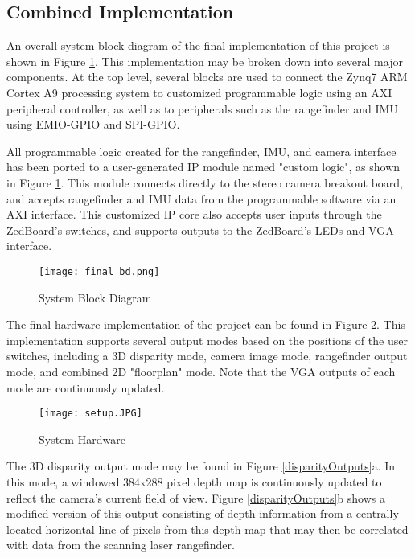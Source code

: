 \subsection{Combined Implementation}
An overall system block diagram of the final implementation of this project is shown in Figure \ref{finalBD}. This implementation may be broken down into several major components. At the top level, several blocks are used to connect the Zynq7 ARM Cortex A9 processing system to customized programmable logic using an AXI peripheral controller, as well as to peripherals such as the rangefinder and IMU using EMIO-GPIO and SPI-GPIO. 
\par
All programmable logic created for the rangefinder, IMU, and camera interface has been ported to a user-generated IP module named "custom logic", as shown in Figure \ref{finalBD}. This module connects directly to the stereo camera breakout board, and accepts rangefinder and IMU data from the programmable software via an AXI interface. This customized IP core also accepts user inputs through the ZedBoard's switches, and supports outputs to the ZedBoard's LEDs and VGA interface. 
\par
\begin{figure}[!htb] 
	\centerline{
	\texttt{[image: final\_bd.png]}
	}
	\caption{System Block Diagram}
	\label{finalBD}
\end{figure}
\par
The final hardware implementation of the project can be found in Figure 
\ref{finalHW}. This implementation supports several output modes based on the positions of the user switches, including a 3D disparity mode, camera image mode, rangefinder output mode, and combined 2D "floorplan" mode. Note that the VGA outputs of each mode are continuously updated. 
\begin{figure}[H]  
 	\centerline{
	\texttt{[image: setup.JPG]}
	}
	\caption{System Hardware}
	\label{finalHW}
\end{figure}
\par
The 3D disparity output mode may be found in Figure \ref{disparityOutputs}a. In this mode, a windowed 384x288 pixel depth map is continuously updated to reflect the camera's current field of view. Figure \ref{disparityOutputs}b shows a modified version of this output consisting of depth information from a centrally-located horizontal line of pixels from this depth map that may then be correlated with data from the scanning laser rangefinder. 
\par
